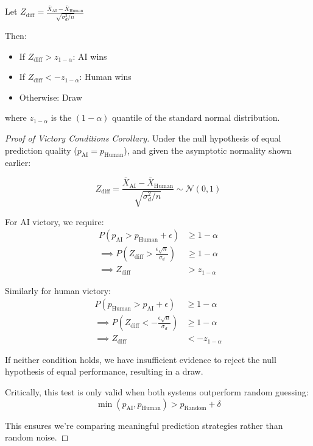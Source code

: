 \begin{corollary}
Let $Z_{\mathrm{diff}} = \frac{\bar{X}_{\mathrm{AI}} - \bar{X}_{\mathrm{Human}}}{\sqrt{\sigma^2_d/n}}$

Then:
\begin{itemize}
\item If $Z_{\mathrm{diff}} > z_{1-\alpha}$: AI wins
\item If $Z_{\mathrm{diff}} < -z_{1-\alpha}$: Human wins
\item Otherwise: Draw
\end{itemize}

where $z_{1-\alpha}$ is the $(1-\alpha)$ quantile of the standard normal distribution.
\end{corollary}

\begin{proof}[Proof of Victory Conditions Corollary]
Under the null hypothesis of equal prediction quality ($p_{\mathrm{AI}} = p_{\mathrm{Human}}$), and given the asymptotic normality shown earlier:

\[Z_{\mathrm{diff}} = \frac{\bar{X}_{\mathrm{AI}} - \bar{X}_{\mathrm{Human}}}{\sqrt{\sigma^2_d/n}} \sim \mathcal{N}(0,1)\]

For AI victory, we require:
\begin{align*}
P(p_{\mathrm{AI}} > p_{\mathrm{Human}} + \epsilon) &\geq 1-\alpha \\
\implies P\left(Z_{\mathrm{diff}} > \frac{\epsilon\sqrt{n}}{\sigma_d}\right) &\geq 1-\alpha \\
\implies Z_{\mathrm{diff}} &> z_{1-\alpha}
\end{align*}

Similarly for human victory:
\begin{align*}
P(p_{\mathrm{Human}} > p_{\mathrm{AI}} + \epsilon) &\geq 1-\alpha \\
\implies P\left(Z_{\mathrm{diff}} < -\frac{\epsilon\sqrt{n}}{\sigma_d}\right) &\geq 1-\alpha \\
\implies Z_{\mathrm{diff}} &< -z_{1-\alpha}
\end{align*}

If neither condition holds, we have insufficient evidence to reject the null hypothesis of equal performance, resulting in a draw.

Critically, this test is only valid when both systems outperform random guessing:
\begin{equation}
\min(p_{\mathrm{AI}}, p_{\mathrm{Human}}) > p_{\mathrm{Random}} + \delta
\end{equation}

This ensures we're comparing meaningful prediction strategies rather than random noise.
\end{proof}

